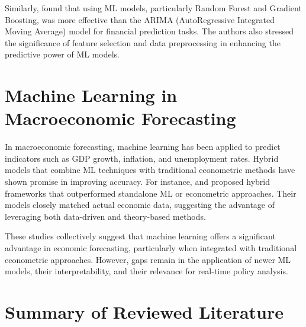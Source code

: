 Similarly, \citet{Chernysh2024-vg} found that using ML models, particularly Random Forest and Gradient Boosting, was more effective than the ARIMA (AutoRegressive Integrated Moving Average) model for financial prediction tasks.
The authors also stressed the significance of feature selection and data preprocessing in enhancing the predictive power of ML models.

\section{Machine Learning in Macroeconomic Forecasting}
\label{sec:ml-in-macroeconomic-forecasting}

In macroeconomic forecasting, machine learning has been applied to predict indicators such as GDP growth, inflation, and unemployment rates.
Hybrid models that combine ML techniques with traditional econometric methods have shown promise in improving accuracy.
For instance, \citet{SaurabhGhosh-AbhishekRanjan} and \citet{Yusuf2025-pc} proposed hybrid frameworks that outperformed standalone ML or econometric approaches.
Their models closely matched actual economic data, suggesting the advantage of leveraging both data-driven and theory-based methods.

These studies collectively suggest that machine learning offers a significant advantage in economic forecasting, particularly when integrated with traditional econometric approaches.
However, gaps remain in the application of newer ML models, their interpretability, and their relevance for real-time policy analysis.

\section{Summary of Reviewed Literature}
\label{sec:summary-of-reviewed-literature}



